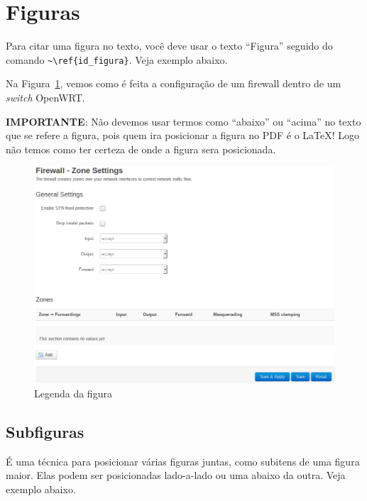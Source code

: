\section{Figuras}

Para citar uma figura no texto, você deve usar o texto ``Figura'' seguido do comando \verb|~\ref{id_figura}|. Veja exemplo abaixo.

Na Figura~\ref{fig:id_figura}, vemos como é feita a configuração de um firewall dentro de um \textit{switch} OpenWRT.

\textbf{IMPORTANTE}: Não devemos usar termos como ``abaixo'' ou ``acima'' no texto que se refere a figura, pois quem ira posicionar a figura no PDF é o LaTeX! Logo não temos como ter certeza de onde a figura sera posicionada.

\begin{figure}[!htb]
    \centering
    \includegraphics[width=\textwidth]{images/firewall_zone}
    \caption{Legenda da figura}
    \label{fig:id_figura}    
\end{figure}

\subsection{Subfiguras}

É uma técnica para posicionar várias figuras juntas, como subitens de uma figura maior. Elas podem ser posicionadas lado-a-lado ou uma abaixo da outra. Veja exemplo abaixo.

